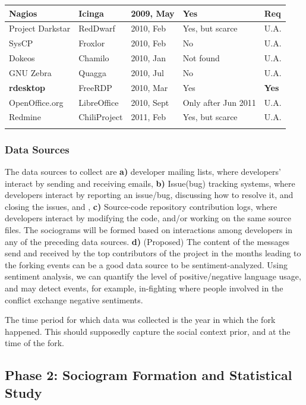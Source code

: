 \documentclass[11pt]{report}
\begin{document}
\begin{table} [H]
\begin{tabular}{m{} m{} m{} m{} m{}}
Nagios & Icinga & 2009, May & Yes & Req \\ \hline
Project Darkstar& RedDwarf & 2010, Feb & Yes, but scarce & U.A. \\ \hline
SysCP & Froxlor & 2010, Feb & No & U.A. \\ \hline
Dokeos & Chamilo & 2010, Jan & Not found & U.A. \\ \hline
GNU Zebra & Quagga & 2010, Jul & No & U.A. \\ \hline
\textbf{rdesktop} & FreeRDP & 2010, Mar & Yes & \textbf{Yes} \\ \hline
OpenOffice.org & LibreOffice & 2010, Sept & Only after Jun 2011 & U.A. \\ \hline
Redmine & ChiliProject & 2011, Feb & Yes, but scarce & U.A. \\
\noalign{\smallskip}\hline
\end{tabular}
\end{table}

\subsubsection{Data Sources}
The data sources to collect are \textbf{a)} developer mailing lists, where developers' interact by sending and receiving emails, \textbf{b)} Issue(bug) tracking systems, where developers interact by reporting an issue/bug, discussing how to resolve it, and closing the issues, and , \textbf{c)} Source-code repository contribution logs, where developers interact by modifying the code, and/or working on the same source files. The sociograms will be formed based on interactions among developers in any of the preceding data sources. \textbf{d)} (Proposed) The content of the messages send and received by the top contributors of the project in the months leading to the forking events can be a good data source to be sentiment-analyzed. Using sentiment analysis, we can quantify the level of positive/negative language usage, and may detect events, for example, in-fighting where people involved in the conflict exchange negative sentiments.

The time period for which data was collected is the year in which the fork happened. This should supposedly capture the social context prior, and at the time of the fork.

\subsection{Phase 2: Sociogram Formation and Statistical Study}
\end{document}
